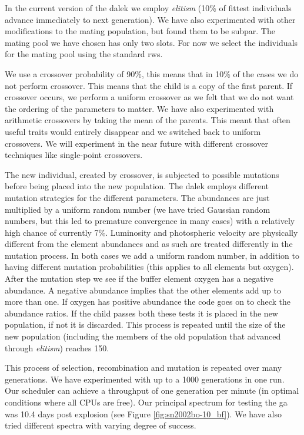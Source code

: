 In the current version of the \gls{dalek} we employ \textit{elitism} (10\% of fittest individuals advance immediately to next generation). We have also experimented with other modifications to the mating population, but found them to be subpar. The mating pool we have chosen has only two slots. For now we select the individuals for the mating pool using the standard \gls{rws}. 

We use a \gls{crossover} probability of 90\%, this means that in 10\% of the cases we do not perform \gls{crossover}. This means that the child is a copy of the first parent. If \gls{crossover} occurs, we perform a uniform crossover as we felt that we do not want the ordering of the parameters to matter. We have also experimented with arithmetic \glspl{crossover} by taking the mean of the parents. This meant that often useful traits would entirely disappear and we switched back to uniform \glspl{crossover}. We will experiment in the near future with different crossover techniques like single-point \glspl{crossover}. 

The new individual, created by crossover, is subjected to possible mutations before being placed into the new population. The \gls{dalek} employs different mutation strategies for the different parameters. The abundances are just multiplied by a uniform random number (we have tried Gaussian random numbers, but this led to premature convergence in many cases) with a relatively high chance of currently 7\%. Luminosity and photospheric velocity are physically different from the element abundances and as such are treated differently in the mutation process. In both cases we add a uniform random number, in addition to having different mutation probabilities (this applies to all elements but oxygen). After the mutation step we see if the buffer element oxygen has a negative abundance. A negative abundance implies that the other elements add up to more than one. If oxygen has positive abundance the code goes on to check the abundance ratios. If the child passes both these tests it is placed in the new population, if not it is discarded. This process is repeated until the size of the new population (including the members of the old population that advanced through \textit{elitism}) reaches 150.

This process of selection, recombination and mutation is repeated over many generations. We have experimented with up to a 1000 generations in one run. Our scheduler can achieve a throughput of one generation per minute (in optimal conditions where all CPUs are free). 
Our principal spectrum for testing the \gls{ga} was  10.4 days post explosion (see Figure \ref{fig:sn2002bo-10_bf}). We have also tried different spectra with varying degree of success.

